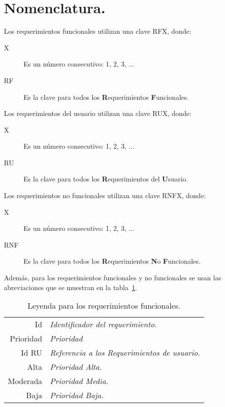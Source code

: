 	
\section{Nomenclatura.}

	Los requerimientos funcionales utilizan una clave RFX, donde:
	
\begin{description}
	\item[X] Es un número consecutivo: 1, 2, 3, ...
	\item[RF] Es la clave para todos los {\bf R}equerimientos {\bf F}uncionales.
\end{description}

	Los requerimientos del usuario utilizan una clave RUX, donde:
	
\begin{description}
	\item[X] Es un número consecutivo: 1, 2, 3, ...
	\item[RU] Es la clave para todos los {\bf R}equerimientos del {\bf U}suario.
\end{description}

Los requerimientos no funcionales utilizan una clave RNFX, donde:
	
\begin{description}
	\item[X] Es un número consecutivo: 1, 2, 3, ...
	\item[RNF] Es la clave para todos los {\bf R}equerimientos {\bf N}o {\bf F}uncionales.
\end{description}

	Además, para los requerimientos funcionales y no funcionales se usan las abreviaciones que se muestran en la tabla~\ref{tbl:leyendaRF}.
\begin{table}[hbtp!]
	\begin{center}
    \begin{tabular}{|r l|}
	    \hline
    	{\footnotesize Id} & {\footnotesize\em Identificador del requerimiento.}\\
    	{\footnotesize Prioridad} & {\footnotesize\em Prioridad}\\
    	{\footnotesize Id RU} & {\footnotesize\em Referencia a los Requerimientos de usuario.}\\
    	{\footnotesize Alta} & {\footnotesize\em Prioridad Alta.}\\
    	{\footnotesize Moderada} & {\footnotesize\em Prioridad Media.}\\
    	{\footnotesize Baja} & {\footnotesize\em Prioridad Baja.}\\
		\hline
    \end{tabular} 
    \caption{Leyenda para los requerimientos funcionales.}
    \label{tbl:leyendaRF}
	\end{center}
\end{table}

